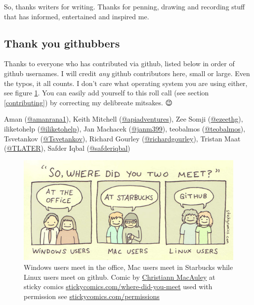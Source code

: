 \documentclass[
]{book}
\begin{document}
So, thanks writers for writing. Thanks for penning, drawing and recording stuff that has informed, entertained and inspired me. 🙏

\hypertarget{github}{%
\subsection{Thank you githubbers}\label{github}}

Thanks to everyone who has contributed via github, listed below in order of github usernames. I will credit \emph{any} github contributors here, small or large. Even the typos, it all counts. I don't care what operating system you are using either, see figure \ref{fig:sticky-comics-fig}. You can easily add yourself to this roll call (see section \ref{contributing}) by correcting my delibreate mitsakes. 😉

Aman (\href{https://github.com/amanrana1}{@amanrana1}), Keith Mitchell (\href{https://github.com/apiadventures}{@apiadventures}), Zee Somji (\href{https://github.com/ezeethg}{@ezeethg}), iliketohelp (\href{https://github.com/iliketohelp}{@iliketohelp}), Jan Machacek (\href{https://github.com/janm399}{@janm399}), teobalmos (\href{https://github.com/teobalmos}{@teobalmos}), Tsvetankov (\href{https://github.com/Tsvetankov}{@Tsvetankov}), Richard Gourley (\href{https://github.com/richardgourley}{@richardgourley}), Tristan Maat (\href{https://github.com/TLATER}{@TLATER}), Safder Iqbal (\href{https://github.com/safderiqbal}{@safderiqbal})

\begin{figure}

{\centering \includegraphics[width=1\linewidth]{images/os_couples} 

}

\caption{Windows users meet in the office, Mac users meet in Starbucks while Linux users meet on github. Comic by \href{https://www.linkedin.com/in/cmacauley}{Christiann MacAuley} at sticky comics \href{https://www.stickycomics.com/where-did-you-meet/}{stickycomics.com/where-did-you-meet} used with permission see \href{https://www.stickycomics.com/permissions/}{stickycomics.com/permissions}}\label{fig:sticky-comics-fig}
\end{figure}
\end{document}
